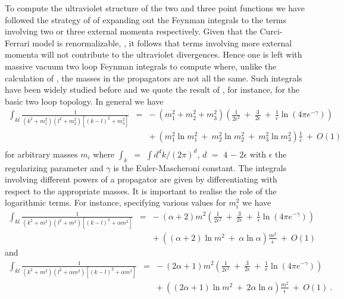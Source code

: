 \documentclass[a4paper,11pt]{article}
\begin{document}
To compute the ultraviolet structure of the two and three point functions we
have followed the strategy of \cite{17,18} of expanding out the Feynman 
integrals to the terms involving two or three external momenta respectively. 
Given that the Curci-Ferrari model is renormalizable, \cite{1,4,5,6}, it 
follows that terms involving more external momenta will not contribute to the 
ultraviolet divergences. Hence one is left with massive vacuum two loop 
Feynman integrals to compute where, unlike the calculation of \cite{17,18}, the
masses in the propagators are not all the same. Such integrals have been widely
studied before and we quote the result of \cite{21}, for instance, for the 
basic two loop topology. In general we have 
\begin{eqnarray} 
\int_{kl} \frac{1}{(k^2+m_1^2)(l^2+m_2^2)[(k-l)^2+m_3^2]} &=& -~ 
(m_1^2+m_2^2+m_3^2) \left( \frac{1}{2\epsilon^2} ~+~ \frac{3}{2\epsilon} ~+~  
\frac{1}{\epsilon} \ln(4\pi e^{-\gamma}) \right) \nonumber \\
&& +~ \left( m_1^2 \ln m_1^2 ~+~ m_2^2 \ln m_2^2 ~+~ m_3^2 \ln m_3^2 \right) 
\frac{1}{\epsilon} ~+~ O(1) \nonumber \\  
\end{eqnarray}
for arbitrary masses $m_i$ where $\int_k$ $=$ $\int d^d k/(2\pi)^d$, $d$ $=$ 
$4$ $-$ $2\epsilon$ with $\epsilon$ the regularizing parameter and $\gamma$ is
the Euler-Mascheroni constant. The integrals involving different powers of a 
propagator are given by differentiating with respect to the appropriate masses.
It is important to realise the role of the logarithmic terms. For instance, 
specifying various values for $m^2_i$ we have  
\begin{eqnarray} 
\int_{kl} \frac{1}{(k^2+m^2)(l^2+m^2)[(k-l)^2+\alpha m^2]} &=& -~ (\alpha+2) 
m^2 \left( \frac{1}{2\epsilon^2} ~+~ \frac{3}{2\epsilon} ~+~ \frac{1}{\epsilon}
\ln(4\pi e^{-\gamma})\right) \nonumber \\
&& +~ \left( (\alpha+2) \ln m^2 ~+~ \alpha \ln \alpha \right) 
\frac{m^2}{\epsilon} ~+~ O(1) 
\end{eqnarray}
and
\begin{eqnarray} 
\int_{kl} \frac{1}{(k^2+m^2)(l^2+ \alpha m^2)[(k-l)^2+\alpha m^2]} &=& -~ 
(2\alpha+1) m^2 \left( \frac{1}{2\epsilon^2} ~+~ \frac{3}{2\epsilon} ~+~ 
\frac{1}{\epsilon} \ln(4\pi e^{-\gamma}) \right) 
\nonumber \\
&& +~ \left( (2\alpha+1) \ln m^2 ~+~ 2 \alpha \ln \alpha \right) 
\frac{m^2}{\epsilon} ~+~ O(1) ~. \nonumber \\ 
\label{basint} 
\end{eqnarray}
\end{document}

